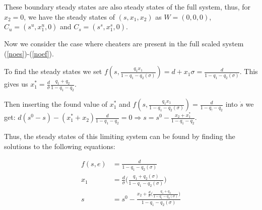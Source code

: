 \documentclass[12pt]{article}
\begin{document}
These boundary steady states are also steady states of the full system, thus, for $x_2=0$, we have the steady states of $(s,x_1,x_2)$ as $W=(0,0,0)$, $C_u=(s^u, x_1^u, 0)$ and $C_s=(s^s, x_1^s, 0)$. 

\pagebreak

\noindent Now we consider the case where cheaters are present in the full scaled system (\ref{noes})-(\ref{noef}). 

\noindent To find the steady states we set $f(s,\frac{q_1 x_1}{1-q_1-q_2(\sigma )})=d+x_1 \sigma = \frac{d}{1-q_1-q_2(\sigma )}$. This gives us $x_1^*=\frac{d}{\sigma}\frac{q_1+q_2}{1-q_1-q_2}$. 

\noindent Then inserting the found value of $x_1^*$ and $f(s,\frac{q_1 x_1}{1-q_1-q_2(\sigma )})=\frac{d}{1-q_!-q_2}$ into $\dot{s}$ we get: $d(s^0-s)-(x_1^*+x_2)\frac{d}{1-q_1-q_2}=0 \Rightarrow s=s^0-\frac{x_2+x_1^*}{1-q_1-q_2}$. 


\noindent Thus, the steady states of this limiting system can be found by finding the solutions to the following equations: 

\begin{align*}
f(s,e)&=\frac{d}{1-q_1-q_2(\sigma)}\\
x_1&= \frac{d}{\sigma} \big( \frac{q_1+q_2(\sigma )}{1-q_1-q_2(\sigma )}\big) \\
s &= s^0 - \frac{x_2+\frac{d}{\sigma}\big( \frac{q_1+q_2}{1-q_1-q_2(\sigma )} \big)}{1-q_1-q_2(\sigma )}
\end{align*}
\end{document}
